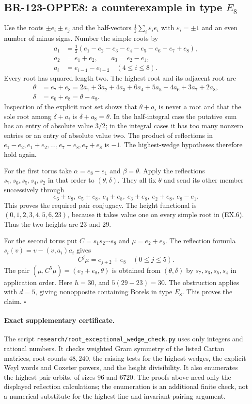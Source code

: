 \subsection{BR-123-OPPE8: a counterexample in type \texorpdfstring{$E_8$}{E8}}
Use the roots $\pm e_i\pm e_j$ and the half-vectors
$\frac12\sum_i\varepsilon_i e_i$ with $\varepsilon_i=\pm1$
and an even number of minus signs.  Number the simple roots by
\[
\begin{split}
 a_1&=\tfrac12(e_1-e_2-e_3-e_4-e_5-e_6-e_7+e_8),\\
 a_2&=e_1+e_2,\qquad a_3=e_2-e_1,\\
 a_i&=e_{i-1}-e_{i-2}\quad(4\leq i\leq8).
\end{split}
 \tag{EX.6}
\]
Every root has squared length two.  The highest root and its
adjacent root are
\[
 \begin{split}
 \theta&=e_7+e_8
       =2a_1+3a_2+4a_3+6a_4+5a_5+4a_6+3a_7+2a_8,\\
 \delta&=e_6+e_8=\theta-a_8.
 \end{split}
\]
Inspection of the explicit root set shows that $\theta+a_i$
is never a root and that the sole root among $\delta+a_i$ is
$\delta+a_8=\theta$.  In the half-integral case the putative
sum has an entry of absolute value $3/2$; in the integral cases
it has too many nonzero entries or an entry of absolute value two.
The product of reflections in
$e_1-e_2,e_1+e_2,\ldots,e_7-e_8,e_7+e_8$ is $-1$.
The highest-wedge hypotheses therefore hold again.

For the first torus take
$\alpha=e_8-e_1$ and $\beta=\theta$.
Apply the reflections $s_7,s_6,s_5,s_4,s_2$ in that order to
$(\theta,\delta)$.  They all fix $\theta$ and send its other
member successively through
\[
 e_6+e_8,\ e_5+e_8,\ e_4+e_8,\ e_3+e_8,
                    \ e_2+e_8,\ e_8-e_1.
\]
This proves the required pair conjugacy.  The height functional
is $(0,1,2,3,4,5,6,23)$, because it takes value one on every
simple root in (EX.6).  Thus the two heights are $23$ and $29$.

For the second torus put $C=s_1s_2\cdots s_8$ and
$\mu=e_2+e_8$.  The reflection formula
$s_i(v)=v-(v,a_i)a_i$ gives
\[
 C^j\mu=e_{j+2}+e_8\quad(0\leq j\leq5).
\]
The pair $(\mu,C^5\mu)=(e_2+e_8,\theta)$ is obtained from
$(\theta,\delta)$ by $s_7,s_6,s_5,s_4$ in application order.
Here $h=30$, and $5(29-23)=30$.  The obstruction applies with
$d=5$, giving nonopposite containing Borels in type $E_8$.
This proves the claim.  $\square$

\paragraph{Exact supplementary certificate.}
The script \texttt{research/root\_exceptional\_wedge\_check.py}
uses only integers and rational numbers.  It checks weighted Gram
symmetry of the listed Cartan matrices, root counts $48,240$, the raising tests for the
highest wedges, the explicit Weyl words and Coxeter powers, and
the height divisibility.  It also enumerates the highest-pair
orbits, of sizes $96$ and $6720$.  The proofs above need only
the displayed reflection calculations; the enumeration is an
additional finite check, not a numerical substitute for the
highest-line and invariant-pairing argument.

